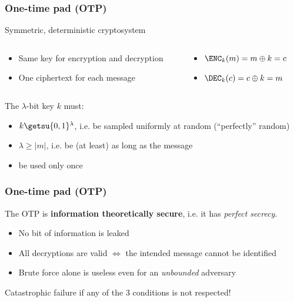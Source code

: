 \begin{frame}
  \frametitle{One-time pad (OTP)}

  Symmetric, deterministic cryptosystem
  \begin{columns}[T]
    \begin{column}{0.55\textwidth}
      \pause
      \begin{itemize}
        \item Same key for encryption and decryption
        \item One ciphertext for each message
      \end{itemize}
    \end{column}
    \begin{column}{0.378\textwidth}
      \pause
      \begin{itemize}
        \item $\ENC_k(m) = m \oplus k = c$
        \item $\DEC_k(c) = c \oplus k = m$
      \end{itemize}
    \end{column}
  \end{columns}

  \vspace*{1em}

  \pause
  The $\lambda$-bit key $k$ must:
  \begin{itemize}[<+(1)->]
    \item $k \getsu \{0,1\}^\lambda$, i.e. be sampled uniformly at random (\enquote{perfectly} random)
    \item $\lambda \ge \lvert m\rvert$, i.e. be (at least) as long as the message 
    \item be used only once
  \end{itemize}
\end{frame}

\begin{frame}
  \frametitle{One-time pad (OTP)}
  The OTP is \textbf{information theoretically secure}, i.e. it has \emph{perfect secrecy}.
  \begin{itemize}[<+(1)->]
    \item No bit of information is leaked
    \item All decryptions are valid $\iff$ the intended message cannot be identified
    \item Brute force alone is useless even for an \emph{unbounded} adversary
  \end{itemize}

  \vspace*{1em}

  \pause
  \begin{center}
    {\color{red} Catastrophic failure if any of the 3 conditions is not respected!}
  \end{center}
\end{frame}

